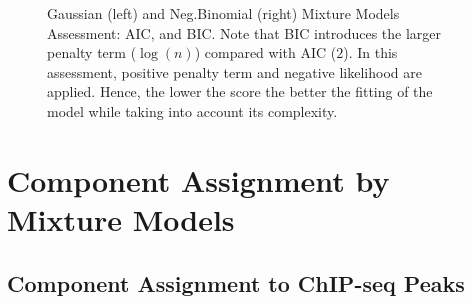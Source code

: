 \documentclass{article}\usepackage[]{graphicx}\usepackage[]{color}
\begin{document}
\begin{figure}[H]                                                                                                   \centering
    \caption{Gaussian (left) and Neg.Binomial (right) Mixture Models Assessment: AIC, and BIC.
    Note that BIC introduces the larger penalty term ($\log(n)$) compared with AIC ($2$).
    In this assessment, positive penalty term and negative likelihood are applied. 
    Hence, the lower the score the better the fitting of the model while taking into account its complexity.}
    \label{fig:ModelAssessment}
\end{figure}
\clearpage

\section{Component Assignment by Mixture Models}
\subsection{Component Assignment to ChIP-seq Peaks}
\end{document}
